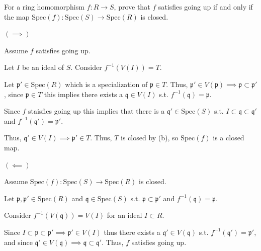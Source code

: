 \documentclass[12pt, letterpaper]{article}
\newcommand{\p}{\mathfrak{p}}
\newcommand{\Spec}{\mathrm{Spec}}
\newcommand{\mf}[1]{\mathfrak{#1}}
\begin{document}
\begin{subproblem}{}
    For a ring homomorphism $f : R \to S$, prove that $f$ satisfies going up if and only if the
map $\Spec(f ) : \Spec(S) \to \Spec(R)$ is closed.
\end{subproblem}
\begin{problemproof}
    $( \implies )$

    Assume $f$ satisfies going up.

    Let $I$ be an ideal of $S$. Consider $f^{-1}(V(I))=T$.

    Let $\p' \in \Spec(R)$ which is a specialization of $\p \in T$. Thus, $\p' \in V(\p) \implies \p \subset \p'$, since $\p \in T$ this implies there exists a $\mf{q} \in V(I)$ s.t. $f^{-1}(\mf{q})=\p$.

    Since $f$ staisfies going up this implies that there is a $\mf{q}' \in \Spec(S)$ s.t. $I \subset \mf{q} \subset \mf{q}'$ and $f^{-1}(\mf{q}')=\p'$.

    Thus, $\mf{q}' \in V(I) \implies \p' \in T$. Thus, $T$ is closed by (b), so $\Spec(f)$ is a closed map.

    $(\impliedby)$

    Assume $\Spec(f) : \Spec(S) \to \Spec(R)$ is closed.

    Let $\p,\p' \in \Spec(R)$ and $\mf{q} \in \Spec(S)$ s.t. $\p \subset \p'$ and $f^{-1}(\mf{q})=\p$.

    Consider $f^{-1}(V(\mf{q}))=V(I)$ for an ideal $I \subset R$.

    Since $I \subset \p \subset \p' \implies \p' \in V(I)$ thus there exists a $\mf{q}' \in V(\mf{q})$ s.t. $f^{-1}(\mf{q}')=\p'$, and since $\mf{q}' \in V(\mf{q}) \implies \mf{q} \subset \mf{q}'$. Thus, $f$ satisfies going up.
\end{problemproof}
\end{document}
